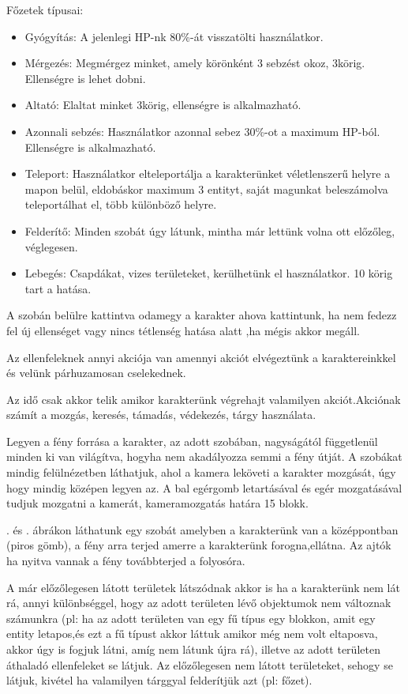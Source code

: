 Főzetek típusai:
\begin{itemize}
\item Gyógyítás: A jelenlegi HP-nk 80\%-át visszatölti használatkor.
\item Mérgezés: Megmérgez minket, amely körönként 3 sebzést okoz, 3körig. Ellenségre is lehet dobni.
\item Altató: Elaltat minket 3körig, ellenségre is alkalmazható.
\item Azonnali sebzés: Használatkor azonnal sebez 30\%-ot a maximum HP-ból. Ellenségre is alkalmazható.
\item Teleport: Használatkor elteleportálja a karakterünket véletlenszerű helyre a mapon belül, eldobáskor maximum 3 entityt, saját magunkat beleszámolva teleportálhat el, több különböző helyre.
\item Felderítő: Minden szobát úgy látunk, mintha már lettünk volna ott előzőleg, véglegesen.
\item Lebegés: Csapdákat, vizes területeket, kerülhetünk el használatkor. 10 körig tart a hatása.
\end{itemize}
\newpage
{}

A szobán belülre kattintva odamegy a karakter ahova kattintunk, ha nem fedezz fel új ellenséget vagy nincs tétlenség hatása alatt ,ha mégis akkor megáll.

Az ellenfeleknek annyi akciója van amennyi akciót elvégeztünk a karaktereinkkel és velünk párhuzamosan cselekednek.

Az idő csak akkor telik amikor karakterünk végrehajt valamilyen akciót.Akciónak számít a mozgás, keresés, támadás, védekezés, tárgy használata.
\newpage
{}

Legyen a fény forrása a karakter, az adott szobában, nagyságától függetlenül minden ki van világítva, hogyha nem akadályozza semmi a fény útját.
A szobákat mindig felülnézetben láthatjuk, ahol a kamera leköveti a karakter mozgását, úgy hogy mindig középen legyen az.
A bal egérgomb letartásával és egér mozgatásával tudjuk mozgatni a kamerát, kameramozgatás határa 15 blokk.

. és . ábrákon láthatunk egy szobát amelyben a karakterünk van a középpontban (piros gömb), a fény arra terjed amerre a karakterünk forogna,ellátna.
Az ajtók ha nyitva vannak a fény továbbterjed a folyosóra.

A már előzőlegesen látott területek látszódnak akkor is ha a karakterünk nem lát rá, annyi különbséggel, hogy az adott területen lévő objektumok nem változnak számunkra (pl: ha az adott területen van egy fű típus egy blokkon, amit egy entity letapos,és ezt a fű típust akkor láttuk amikor még nem volt eltaposva, akkor úgy is fogjuk látni, amíg nem látunk újra rá), illetve az adott területen áthaladó ellenfeleket se látjuk.
Az előzőlegesen nem látott területeket, sehogy se látjuk, kivétel ha valamilyen tárggyal felderítjük azt (pl: főzet).

